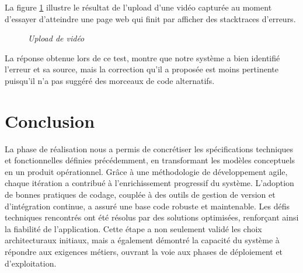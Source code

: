 \documentclass[12pt,a4paper]{report}
\begin{document}
	La figure \ref{fig:video} illustre le résultat de l'upload d'une vidéo capturée au moment d'essayer d'atteindre une page web qui finit par afficher des stacktraces d'erreurs.
	
	\begin{figure}[H]
		\centering
		\caption{\textit{Upload de vidéo}}
		\label{fig:video}
	\end{figure}
	
	La réponse obtenue lors de ce test, montre que notre système a bien identifié l'erreur et sa source, mais la correction qu'il a proposée est moins pertinente puisqu'il n'a pas suggéré des morceaux de code alternatifs.
	
	\section{Conclusion}
	
	La phase de réalisation nous a permis de concrétiser les spécifications techniques et fonctionnelles définies précédemment, en transformant les modèles conceptuels en un produit opérationnel. Grâce à une méthodologie de développement agile, chaque itération a contribué à l’enrichissement progressif du système. L’adoption de bonnes pratiques de codage, couplée à des outils de gestion de version et d’intégration continue, a assuré une base code robuste et maintenable. Les défis techniques rencontrés ont été résolus par des solutions optimisées, renforçant ainsi la fiabilité de l’application. Cette étape a non seulement validé les choix architecturaux initiaux, mais a également démontré la capacité du système à répondre aux exigences métiers, ouvrant la voie aux phases de déploiement et d’exploitation.
	
\end{document}
